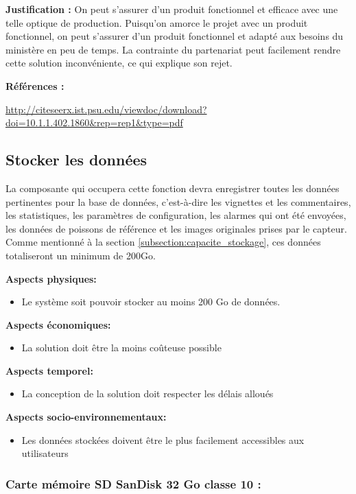 \textbf{Justification :} On peut s’assurer d’un produit fonctionnel et efficace avec une telle optique de production. Puisqu’on amorce le projet avec un produit fonctionnel, on peut s’assurer d’un produit fonctionnel et adapté aux besoins du ministère en peu de temps. La contrainte du partenariat peut facilement rendre cette solution inconvéniente, ce qui explique son rejet.


\textbf{Références :}

\url{http://citeseerx.ist.psu.edu/viewdoc/download?doi=10.1.1.402.1860&rep=rep1&type=pdf}



\subsection{Stocker les données}
La composante qui occupera cette fonction devra enregistrer toutes les données pertinentes pour la base de données, c'est-à-dire les vignettes et les commentaires, les statistiques, les paramètres de configuration, les alarmes  qui ont été envoyées, les données de poissons de référence et les images originales prises par le capteur.
Comme mentionné à la section \ref{subsection:capacite_stockage}, ces données totaliseront un minimum de 200Go.

\textbf{Aspects physiques:}
\begin{itemize} [label = {--}]
    \item Le système soit pouvoir stocker au moins 200 Go de données.
\end{itemize}

\textbf{Aspects économiques:}
\begin{itemize} [label = {--}]
    \item La solution doit être la moins coûteuse possible
\end{itemize}

\textbf{Aspects temporel:}
\begin{itemize} [label = {--}]
    \item La conception de la solution doit respecter les délais alloués
\end{itemize}

\textbf{Aspects socio-environnementaux:}
\begin{itemize} [label = {--}]
    \item Les données stockées doivent être le plus facilement accessibles aux utilisateurs
\end{itemize}

\subsubsection{Carte mémoire SD SanDisk 32 Go classe 10 :}

